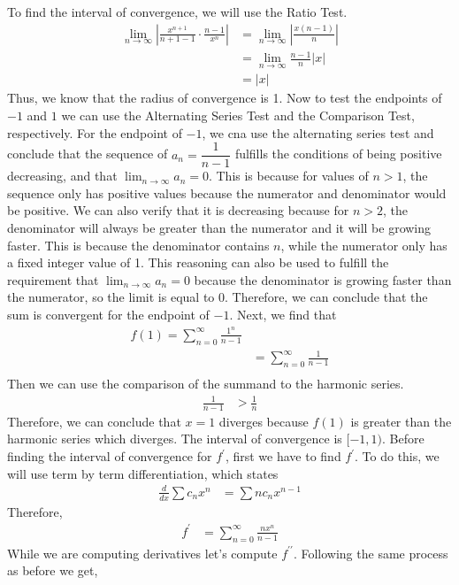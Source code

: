 \documentclass{article}
\begin{document}
\begin{enumerate}[label=\textbf{(14.\arabic*)}]
To find the interval of convergence, we will use the Ratio Test.
\begin{align*}
\lim_{n\to\infty} \left|\frac{x^{n+1}}{n+1-1}\cdot\frac{n-1}{x^n}\right| &= \lim_{n\to\infty} \left|\frac{x(n-1)}{n}\right|\\
&= \lim_{n\to\infty} \frac{n-1}{n}|x|\\
&= |x|
\end{align*}
Thus, we know that the radius of convergence is 1. Now to test the endpoints of $-1$ and $1$ we can use the Alternating Series Test and the Comparison Test, respectively.
For the endpoint of $-1$, we cna use the alternating series test and conclude that the sequence of $a_n=\dfrac{1}{n-1}$ fulfills the conditions of being positive decreasing, and  that $\displaystyle \lim_{n\to\infty} a_n=0$. This is because for values of $n>1$, the sequence only has positive values because the numerator and denominator would be positive. We can also verify that it is decreasing because for $n>2$, the denominator will always be greater than the numerator and it will be growing faster. This is because the denominator contains $n$, while the numerator only has a fixed integer value of 1. This reasoning can also be used to fulfill the requirement that $\lim_{n\to\infty} a_n=0$ because the denominator is growing faster than the numerator, so the limit is equal to 0. Therefore, we can conclude that the sum is convergent for the endpoint of $-1$. Next, we find that
\begin{align*}
f(1)=\sum_{n=0}^\infty \frac{1^n}{n-1}\\
&= \sum_{n=0}^\infty \frac{1}{n-1}\\
\end{align*}
Then we can use the comparison of the summand to the harmonic series.
\begin{align*}
\frac{1}{n-1} &> \frac{1}{n}
\end{align*}
Therefore, we can conclude that $x=1$ diverges because $f(1)$ is greater than the harmonic series which diverges. The interval of convergence is $[-1,1)$. Before finding the interval of convergence for $f^\prime$, first we have to find $f^\prime$. To do this, we will use term by term differentiation, which states
\begin{align*}
\frac{d}{dx}\sum c_nx^n &= \sum nc_nx^{n-1}
\end{align*}
Therefore,
\begin{align*}
f^\prime &= \sum_{n=0}^\infty \frac{nx^n}{n-1}
\end{align*}
While we are computing derivatives let's compute $f^{\prime\prime}$. Following the same process as before we get,

\end{enumerate}
\end{document}
